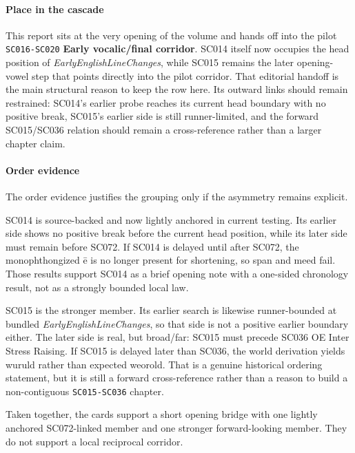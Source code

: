 \documentclass[
  british,
  a4paper,
]{article}
\begin{document}
\paragraph{Place in the cascade}\label{place-in-the-cascade-11}

This report sits at the very opening of the volume and hands off into
the pilot \texttt{SC016-SC020} \textbf{Early vocalic/final corridor}.
SC014 itself now occupies the head position of
\emph{EarlyEnglishLineChanges}, while SC015 remains the later
opening-vowel step that points directly into the pilot corridor. That
editorial handoff is the main structural reason to keep the row here.
Its outward links should remain restrained: SC014's earlier probe
reaches its current head boundary with no positive break, SC015's
earlier side is still runner-limited, and the forward SC015/SC036
relation should remain a cross-reference rather than a larger chapter
claim.

\paragraph{Order evidence}\label{order-evidence-11}

The order evidence justifies the grouping only if the asymmetry remains
explicit.

SC014 is source-backed and now lightly anchored in current testing. Its
earlier side shows no positive break before the current head position,
while its later side must remain before SC072. If SC014 is delayed until
after SC072, the monophthongized ē is no longer present for shortening,
so span and meed fail. Those results support SC014 as a brief opening
note with a one-sided chronology result, not as a strongly bounded local
law.

SC015 is the stronger member. Its earlier search is likewise
runner-bounded at bundled \emph{EarlyEnglishLineChanges}, so that side
is not a positive earlier boundary either. The later side is real, but
broad/far: SC015 must precede SC036 OE Inter Stress Raising. If SC015 is
delayed later than SC036, the world derivation yields wuruld rather than
expected weorold. That is a genuine historical ordering statement, but
it is still a forward cross-reference rather than a reason to build a
non-contiguous \texttt{SC015-SC036} chapter.

Taken together, the cards support a short opening bridge with one
lightly anchored SC072-linked member and one stronger forward-looking
member. They do not support a local reciprocal corridor.
\end{document}
